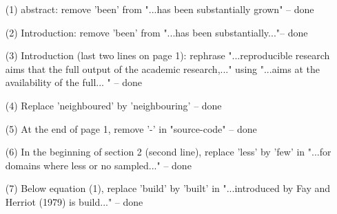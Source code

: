 \documentclass[11pt]{article}
\begin{document}
\begin{itemize}
\item[(1)]abstract: remove 'been' from "...has been substantially grown" -- done
\item[(2)]Introduction: remove 'been' from "...has been substantially..."-- done
\item[(3)]Introduction (last two lines on page 1): rephrase "...reproducible research aims that the full output of the academic research,..." using "...aims at the availability of the full... " -- done
\item[(4)]Replace 'neighboured' by 'neighbouring' -- done
\item[(5)]At the end of page 1, remove '-' in "source-code" -- done
\item[(6)]In the beginning of section 2 (second line), replace 'less' by 'few' in "...for domains where less or no sampled..." -- done
\item[(7)]Below equation (1), replace 'build' by 'built' in "...introduced by Fay and Herriot (1979) is build..." -- done
\end{itemize}
\end{document}
